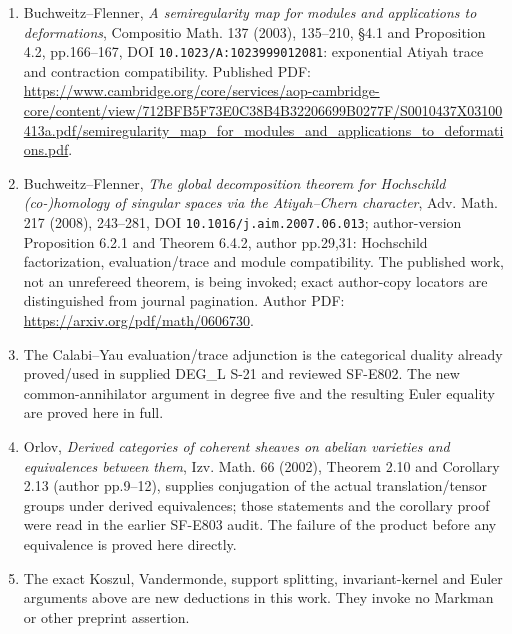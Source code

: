 \begin{enumerate}
\def\labelenumi{\arabic{enumi}.}
\item
  Buchweitz--Flenner, \emph{A semiregularity map for modules and
  applications to deformations}, Compositio Math. 137 (2003), 135--210,
  §4.1 and Proposition 4.2, pp.166--167, DOI
  \texttt{10.1023/A:1023999012081}: exponential Atiyah trace and
  contraction compatibility. Published PDF:
  \url{https://www.cambridge.org/core/services/aop-cambridge-core/content/view/712BFB5F73E0C38B4B32206699B0277F/S0010437X03100413a.pdf/semiregularity_map_for_modules_and_applications_to_deformations.pdf}.
\item
  Buchweitz--Flenner, \emph{The global decomposition theorem for
  Hochschild (co-)homology of singular spaces via the Atiyah--Chern
  character}, Adv. Math. 217 (2008), 243--281, DOI
  \texttt{10.1016/j.aim.2007.06.013}; author-version Proposition 6.2.1
  and Theorem 6.4.2, author pp.29,31: Hochschild factorization,
  evaluation/trace and module compatibility. The published work, not an
  unrefereed theorem, is being invoked; exact author-copy locators are
  distinguished from journal pagination. Author PDF:
  \url{https://arxiv.org/pdf/math/0606730}.
\item
  The Calabi--Yau evaluation/trace adjunction is the categorical duality
  already proved/used in supplied DEG\_L S-21 and reviewed SF-E802. The
  new common-annihilator argument in degree five and the resulting Euler
  equality are proved here in full.
\item
  Orlov, \emph{Derived categories of coherent sheaves on abelian
  varieties and equivalences between them}, Izv. Math. 66 (2002),
  Theorem 2.10 and Corollary 2.13 (author pp.9--12), supplies
  conjugation of the actual translation/tensor groups under derived
  equivalences; those statements and the corollary proof were read in
  the earlier SF-E803 audit. The failure of the product before any
  equivalence is proved here directly.
\item
  The exact Koszul, Vandermonde, support splitting, invariant-kernel and
  Euler arguments above are new deductions in this work. They invoke no
  Markman or other preprint assertion.
\end{enumerate}
